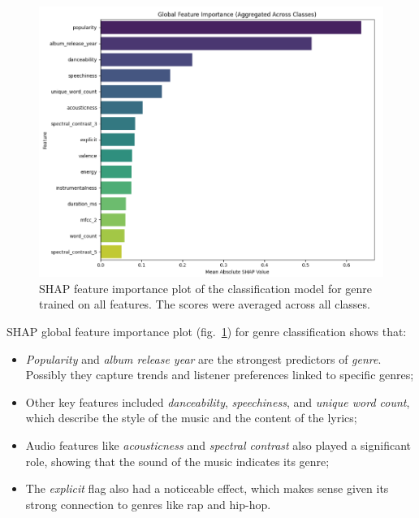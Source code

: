 \begin{center}
\begin{figure}[H]
  \centering
  \includegraphics[width=6in]{img/feature_importance_genre_clf.png}
  \caption{SHAP feature importance plot of the classification model for genre
  trained on all features. The scores were averaged across all classes.}
  \label{Figure:feature_importance_genre_clf}
\end{figure}
\end{center}

SHAP global feature importance
plot (fig.~\ref{Figure:feature_importance_genre_clf}) for genre classification
shows that:
\begin{itemize}
  \item \textit{Popularity} and \textit{album release year} are the strongest
    predictors of \textit{genre}.  Possibly they capture trends and listener
    preferences linked to specific genres;
  \item Other key features included \textit{danceability},
    \textit{speechiness}, and \textit{unique word count}, which describe the
    style of the music and the content of the lyrics;
  \item Audio features like \textit{acousticness} and
    \textit{spectral contrast} also played a significant role, showing
    that the sound of the music indicates its genre;
  \item The \textit{explicit} flag also had a noticeable effect, which makes
    sense given its strong connection to genres like rap and hip-hop.

\end{itemize}

